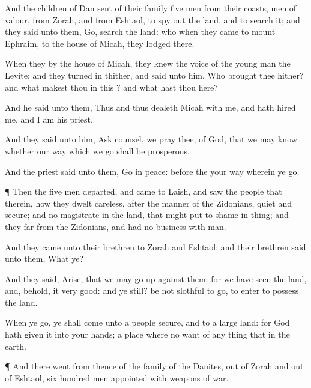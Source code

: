 {And the
children of
Dan
sent of their
family
five
men from their
coasts,
men of
valour, from
Zorah, and from
Eshtaol, to
spy out the
land, and to
search it; and they
said unto them,
Go,
search the
land: who when they
came to
mount
Ephraim, to the
house of
Micah, they
lodged there.

When they
{} by the
house of
Micah, they
knew the
voice of the young
man the
Levite: and they turned
in thither, and
said unto him, Who
brought thee
hither? and what
makest thou in this
{}? and what hast thou here?

And he
said unto them,
Thus and
thus
dealeth
Micah with me, and hath
hired me, and I am his
priest.

And they
said unto him, Ask
counsel, we pray thee, of
God, that we may
know whether our
way which we
go shall be
prosperous.

And the
priest
said unto them,
Go in
peace:
before the
{}
{} your
way wherein ye
go.


\par }{\PP {}¶ Then the
five
men
departed, and
came to
Laish, and
saw the
people that
{}
therein, how they
dwelt
careless, after the
manner of the
Zidonians,
quiet and
secure; and
{} no
magistrate in the
land, that might put
{} to
shame in
{}
thing; and they
{}
far from the
Zidonians, and had no
business with
{}
man.

And they
came unto their
brethren to
Zorah and
Eshtaol: and their
brethren
said unto them, What
{} ye?

And they
said,
Arise, that we may go
up against them: for we have
seen the
land, and, behold, it
{}
very
good: and
{} ye
still? be not
slothful to
go,
{} to
enter to
possess the
land.

When ye
go, ye shall
come unto a
people
secure, and to a
large
land: for
God hath
given it into your
hands; a
place where
{} no
want of any
thing that
{} in the
earth.


\par }{\PP {}¶ And there
went from thence of the
family of the
Danites, out of
Zorah and out of
Eshtaol,
six
hundred
men
appointed with
weapons of
war.

}
